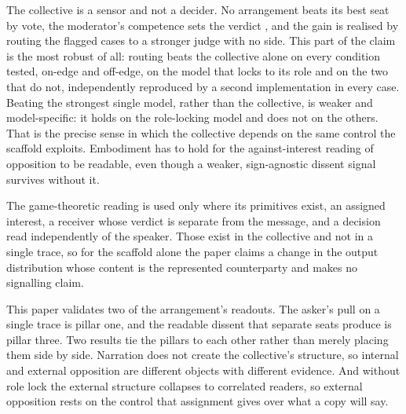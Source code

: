 The collective is a sensor and not a decider. No arrangement beats its best
seat by vote, the moderator's competence sets the verdict
\citep{shin1998adversarial},
and the gain is realised by routing the flagged cases to a stronger judge
with no side. This part of the claim is the most robust of all: routing
beats the collective alone on every condition tested, on-edge and
off-edge, on the model that locks to its role and on the two that do not,
independently reproduced by a second implementation in every case.
Beating the strongest single model, rather than the collective, is
weaker and model-specific: it holds on the role-locking model and does
not on the others.
That is the precise sense in which the collective depends on the same
control the scaffold exploits. Embodiment has to hold for the
against-interest reading of opposition to be readable, even though a
weaker, sign-agnostic dissent signal survives without it.

The game-theoretic reading is used only where its primitives exist, an
assigned interest, a receiver whose verdict is separate from the message,
and a decision read independently of the speaker. Those exist in the
collective and not in a single trace, so for the scaffold alone the paper
claims a change in the output distribution whose content is the
represented counterparty and makes no signalling claim.


This paper validates two of the arrangement's readouts. The asker's pull
on a single trace is pillar one, and the readable dissent that separate
seats produce is pillar three. Two results tie the pillars to each other
rather than merely placing them side by side. Narration does not create
the collective's structure, so internal and external opposition are
different objects with different evidence. And without role lock the
external structure collapses to correlated readers, so external opposition
rests on the control that assignment gives over what a copy will say.
